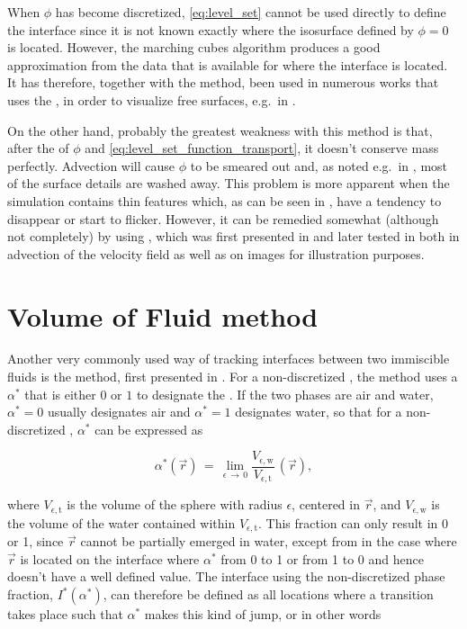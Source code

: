 When $\phi$ has become discretized, \eqref{eq:level_set} cannot be used directly to define the interface since it is not known exactly where the isosurface defined by $\phi = 0$ is located. However, the marching cubes algorithm produces a good approximation from the data that is available for where the interface is located. It has therefore, together with the \LS method, been used in numerous works that uses the \FVM, in order to visualize free surfaces, e.g.\ in \citep{Losasso2004}.

On the other hand, probably the greatest weakness with this method is that, after the \discretization of $\phi$ and \eqref{eq:level_set_function_transport}, it doesn't conserve mass perfectly. Advection will cause $\phi$ to be smeared out and, as noted e.g.\ in \citep{Wojtan2009}, most of the surface details are washed away. This problem is more apparent when the simulation contains thin features which, as can be seen in \citep{nthuerey2009}, have a tendency to disappear or start to flicker. However, it can be remedied somewhat (although not completely) by using \BFECC, which was first presented in \citep{Dupont2003} and later tested in \citep{Kim2005} both in advection of the velocity field as well as on images for illustration purposes.

\section{Volume of Fluid method}

Another very commonly used way of tracking interfaces between two immiscible fluids is the \VOF method, first presented in \citep{Hirt1981}. For a non-discretized \PDE, the \VOF method uses a  $\alpha^*$ that is either $0$ or $1$ to designate the \phase. If the two phases are air and water, $\alpha^* = 0$ usually designates air and $\alpha^* = 1$ designates water, so that for a non-discretized \PDE, $\alpha^*$ can be expressed as

\begin{equation} \label{eq:phase_fraction_continuous}
\alpha^*(\vec{r}) \,=\, \lim_{\epsilon\,\rightarrow\,0} \frac{V_{\epsilon,\text{w}}}{V_{\epsilon,\text{t}}}\,(\vec{r}),
\end{equation}

where $V_{\epsilon,\text{t}}$ is the volume of the sphere with radius $\epsilon$, centered in $\vec{r}$, and $V_{\epsilon,\text{w}}$ is the volume of the water contained within $V_{\epsilon,\text{t}}$. This fraction can only result in 0 or 1, since $\vec{r}$ cannot be partially emerged in water, except from in the case where $\vec{r}$ is located on the interface where $\alpha^*$  from 0 to 1 or from 1 to 0 and hence doesn't have a well defined value. The interface using the non-discretized phase fraction, $I^*(\alpha^*)$, can therefore be defined as all locations where a transition takes place such that $\alpha^*$ makes this kind of jump, or in other words


